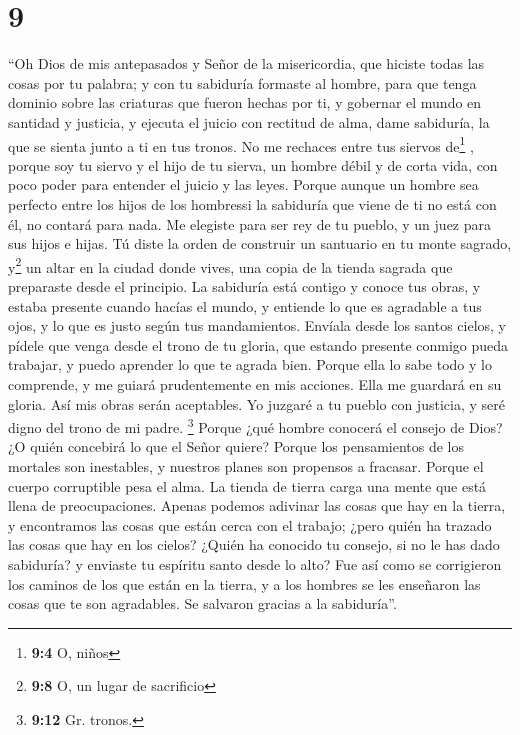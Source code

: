 \hypertarget{section-8}{%
\section{9}\label{section-8}}

 ``Oh Dios de mis antepasados y Señor de la misericordia,
que hiciste todas las cosas por tu palabra;  y con tu
sabiduría formaste al hombre, para que tenga dominio sobre las criaturas
que fueron hechas por ti,  y gobernar el mundo en santidad
y justicia, y ejecuta el juicio con rectitud de alma, 
dame sabiduría, la que se sienta junto a ti en tus tronos. No me
rechaces entre tus siervos de\footnote{\textbf{9:4} O, niños} ,
 porque soy tu siervo y el hijo de tu sierva, un hombre
débil y de corta vida, con poco poder para entender el juicio y las
leyes.  Porque aunque un hombre sea perfecto entre los
hijos de los hombressi la sabiduría que viene de ti no está con él, no
contará para nada.  Me elegiste para ser rey de tu pueblo,
y un juez para sus hijos e hijas.  Tú diste la orden de
construir un santuario en tu monte sagrado, y\footnote{\textbf{9:8} O,
  un lugar de sacrificio} un altar en la ciudad donde vives, una copia
de la tienda sagrada que preparaste desde el principio. 
La sabiduría está contigo y conoce tus obras, y estaba presente cuando
hacías el mundo, y entiende lo que es agradable a tus ojos, y lo que es
justo según tus mandamientos.  Envíala desde los santos
cielos, y pídele que venga desde el trono de tu gloria, que estando
presente conmigo pueda trabajar, y puedo aprender lo que te agrada bien.
 Porque ella lo sabe todo y lo comprende, y me guiará
prudentemente en mis acciones. Ella me guardará en su gloria.
 Así mis obras serán aceptables. Yo juzgaré a tu pueblo
con justicia, y seré digno del trono de mi padre. \footnote{\textbf{9:12}
  Gr. tronos.}  Porque ¿qué hombre conocerá el consejo de
Dios? ¿O quién concebirá lo que el Señor quiere?  Porque
los pensamientos de los mortales son inestables, y nuestros planes son
propensos a fracasar.  Porque el cuerpo corruptible pesa
el alma. La tienda de tierra carga una mente que está llena de
preocupaciones.  Apenas podemos adivinar las cosas que
hay en la tierra, y encontramos las cosas que están cerca con el
trabajo; ¿pero quién ha trazado las cosas que hay en los cielos?
 ¿Quién ha conocido tu consejo, si no le has dado
sabiduría? y enviaste tu espíritu santo desde lo alto? 
Fue así como se corrigieron los caminos de los que están en la tierra, y
a los hombres se les enseñaron las cosas que te son agradables. Se
salvaron gracias a la sabiduría''.

